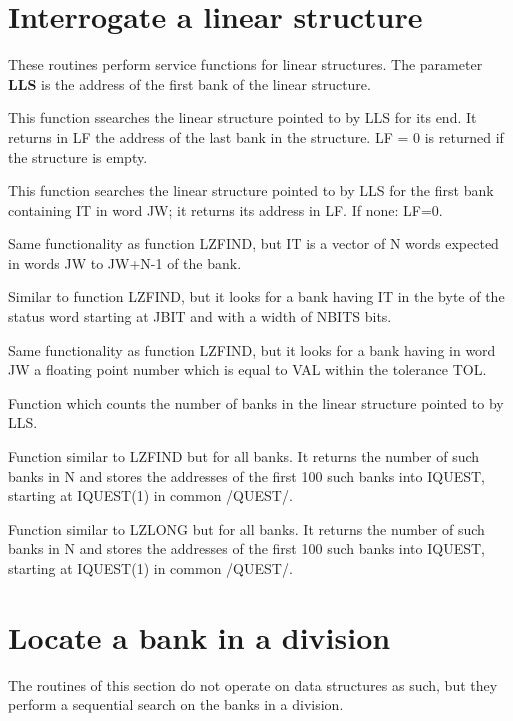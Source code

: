 \section{Interrogate a linear structure}
\par These routines perform service functions for linear structures.
The parameter {\bf LLS} is the address of the first bank
of the linear structure.
\par This function ssearches the linear structure pointed to by LLS
for its end.
It returns in LF the address of the last bank in the structure.
LF = 0 is returned if the structure is empty.
\par This function searches the linear structure pointed to by LLS
for the first bank containing IT in word JW;
it returns its address in LF.
If none:  LF=0.
\par Same functionality as function LZFIND,
but IT is a vector of N words expected
in words JW to JW+N-1 of the bank.
\par Similar to function LZFIND,
but it looks for a bank having IT in the byte of the status word
starting at JBIT and with a width of NBITS bits.
\par Same functionality as function LZFIND,
but it looks for a bank having in word JW a floating point number
which is equal to VAL within the tolerance TOL.
\par Function which counts the number of banks in the linear
structure pointed to by LLS.
\par Function similar to LZFIND but for all banks.
It returns the number of such banks in N
and stores the addresses of the first 100 such banks into IQUEST,
starting at IQUEST(1) in common /QUEST/.
\par Function similar to LZLONG but for all banks.
It returns the number of such banks in N
and stores the addresses of the first 100 such banks into IQUEST,
starting at IQUEST(1) in common /QUEST/.
\section{Locate a bank in a division}
\par
The routines of this section do not operate on data structures as such,
but they perform a sequential search on the banks in a division.
